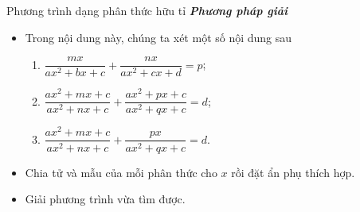 \begin{dang}{Phương trình dạng phân thức hữu tỉ}
	\textbf{\textit{Phương pháp giải}}
	\begin{itemize}
		\item Trong nội dung này, chúng ta xét một số nội dung sau
		\begin{enumerate}
			\item $\dfrac{mx}{ax^2+bx+c}+\dfrac{nx}{ax^2+cx+d}=p$;
			\item $\dfrac{ax^2+mx+c}{ax^2+nx+c}+\dfrac{ax^2+px+c}{ax^2+qx+c}=d$;
			\item $\dfrac{ax^2+mx+c}{ax^2+nx+c}+\dfrac{px}{ax^2+qx+c}=d$.
		\end{enumerate}
	\item Chia tử và mẫu của mỗi phân thức cho $x$ rồi đặt ẩn phụ thích hợp.
	\item Giải phương trình vừa tìm được.
	\end{itemize}
\end{dang}
